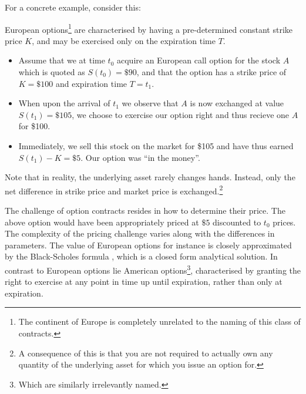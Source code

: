 For a concrete example, consider this:
\begin{example}
  European options\footnote{The continent of Europe is completely unrelated to
  the naming of this class of contracts.} are characterised by having a pre-determined
  constant strike price $K$, and may be exercised only on the expiration time
  $T$.

  \begin{itemize}
  \item Assume that we at time $t_0$ acquire an European call option
    for the stock $A$ which is quoted as $S(t_0)=\$90$, and that the
    option has a strike price of $K=\$100$ and expiration time
    $T=t_1$.


  \item When upon the arrival of $t_1$ we observe that $A$ is now
    exchanged at value $S(t_1)=\$105$, we choose to exercise our option right
    and thus recieve one $A$ for \$100.

    \item Immediately, we sell this stock on the market for \$105 and have thus
      earned $S(t_1)-K=\$5$. Our option was ``in the money''.
  \end{itemize}

  Note that in reality, the underlying asset rarely changes
  hands. Instead, only the net difference in strike price and market
  price is exchanged.\footnote{A consequence of this is that you are
    not required to actually own any quantity of the underlying asset
    for which you issue an option for.}
\end{example}

The challenge of option contracts resides in how to determine their
price. The above option would have been appropriately priced at $\$5$
discounted to $t_0$ prices. The complexity of the pricing challenge
varies along with the differences in parameters.  The value of
European options for instance is closely approximated by the
Black-Scholes formula \cite{black1973pricing}, which is a closed form
analytical solution.  In contrast to European options lie American
options\footnote{Which are similarly irrelevantly named.},
characterised by granting the right to exercise at any point in time
up until expiration, rather than only at expiration.

